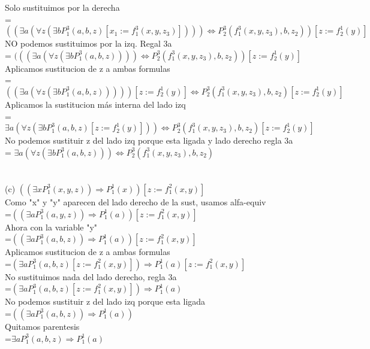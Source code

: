 \documentclass{article}
\begin{document}
Solo sustituimos por la derecha \\
= $((\exists a(\forall z(\exists bP^3_1(a,b,z)[x_1:=f^3_1(x,y,z_3)])))\Leftrightarrow P^3_2(f^3_1(x,y,z_3),b,z_2))[z:=f^1_2(y)]$\\
NO podemos sustituimos por la izq. Regal 3a\\
= $(((\exists a(\forall z(\exists bP^3_1(a,b,z))))\Leftrightarrow P^3_2(f^3_1(x,y,z_3),b,z_2))[z:=f^1_2(y)]$\\
Aplicamos sustitucion de z a ambas formulas\\
= $((\exists a(\forall z(\exists bP^3_1(a,b,z)))))[z:=f^1_2(y)]\Leftrightarrow P^3_2(f^3_1(x,y,z_3),b,z_2)[z:=f^1_2(y)]$\\
Aplicamos la sustitucion más interna del lado izq\\
= $\exists a(\forall z(\exists bP^3_1(a,b,z)[z:=f^1_2(y)]))\Leftrightarrow P^3_2(f^3_1(x,y,z_3),b,z_2)[z:=f^1_2(y)]$\\
No podemos sustituir z del lado izq porque esta ligada y lado derecho regla 3a\\
= $\exists a(\forall z(\exists bP^3_1(a,b,z)))\Leftrightarrow P^3_2(f^3_1(x,y,z_3),b,z_2)$\\
\\
\\
(c) $((\exists xP^3_1(x,y,z)) \Rightarrow P^1_1(x))[z:=f^2_1(x,y)]$\\
Como "x" y "y" aparecen del lado derecho de la sust, usamos alfa-equiv\\
=$((\exists aP^3_1(a,y,z)) \Rightarrow P^1_1(a))[z:=f^2_1(x,y)]$\\
Ahora con la variable "y"\\
=$((\exists aP^3_1(a,b,z)) \Rightarrow P^1_1(a))[z:=f^2_1(x,y)]$\\
Aplicamos sustitucion de z a ambas formulas\\
=$(\exists aP^3_1(a,b,z)[z:=f^2_1(x,y)]) \Rightarrow P^1_1(a)[z:=f^2_1(x,y)]$\\
No sustituimos nada del lado derecho, regla 3a\\
=$(\exists aP^3_1(a,b,z)[z:=f^2_1(x,y)]) \Rightarrow P^1_1(a)$\\
No podemos sustituir z del lado izq porque esta ligada\\
=$((\exists aP^3_1(a,b,z)) \Rightarrow P^1_1(a))$\\
Quitamos parentesis\\
=$\exists aP^3_1(a,b,z) \Rightarrow P^1_1(a)$\\
\\
\end{document}
